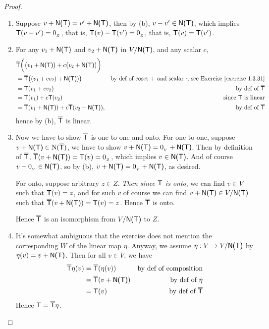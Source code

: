 \begin{proof} \ 

\begin{enumerate}
\item Suppose \(v + \textsf{N(T)} = v' + \textsf{N(T)}\), then by (b), \(v - v' \in \textsf{N(T)}\), which implies \(\textsf{T}(v - v') = 0_{_Z}\), that is, \(\textsf{T}(v) - \textsf{T}(v') = 0_{_Z}\), that is, \(\textsf{T}(v) = \textsf{T}(v')\).

\item For any \(v_1 + \textsf{N(T)}\) and \(v_2 + \textsf{N(T)}\) in \(V/\textsf{N(T)}\), and any scalar \(c\),
\begin{align*}
    & \overline{\T}\bigg( \big( v_1 + \NULLT \big) + c \big(v_2 + \NULLT \big)  \bigg) \\
    & = \overline{\T}\big( (v_1 + cv_2) + \NULLT) \big) & \text{by def of coset \(+\) and scalar \(\cdot\), see \EXEC{1.3.31}} \\
    & = \T(v_1 + cv_2) & \text{by def of \(\overline{\T}\)} \\
    & = \T(v_1) + c\T(v_2) & \text{since \(\T\) is linear} \\
    & = \overline{\T}(v_1 + \NULLT) + c\overline{\T}(v_2 + \NULLT), & \text{by def of \(\overline{\T}\)}
\end{align*}
hence by (b), \(\overline{\textsf{T}}\) is linear.

\item Now we have to show \(\overline{\textsf{T}}\) is one-to-one and onto.
For one-to-one, suppose \(v + \textsf{N(T)} \in \mathrm{N}(\overline{\textsf{T}})\), we have to show \(v + \textsf{N(T)} = 0_{_V} + \textsf{N(T)}\).
Then by definition of \(\overline{\textsf{T}}\), \(\overline{\textsf{T}}(v + \textsf{N(T)}) = \textsf{T}(v) = 0_{_Z}\), which implies \(v \in \textsf{N(T)}\).
And of course \(v - 0_{_V} \in \textsf{N(T)}\), so by (b), \(v + \textsf{N(T)} = 0_{_V} + \textsf{N(T)}\), as desired.

For onto, suppose arbitrary \(z \in Z\).
\emph{Then since \(\textsf{T}\) is onto}, we can find \(v \in V\) such that \(\textsf{T}(v) = z\), and for such \(v\) of course we can find \(v + \textsf{N(T)} \in V/\textsf{N(T)}\) such that \(\overline{\textsf{T}}(v + \textsf{N(T)}) = \textsf{T}(v) = z\).
Hence \(\overline{\textsf{T}}\) is onto.

Hence \(\overline{\textsf{T}}\) is an isomorphism from \(V/\textsf{N(T)}\) to \(Z\).

\item It's somewhat ambiguous that the exercise does not mention the corresponding \(W\) of the linear map \(\eta\).
Anyway, we assume \(\eta : V \to V/\textsf{N(T)}\) by \(\eta(v) = v + \textsf{N(T)}\).
Then for all \(v \in V\), we have
\begin{align*}
    \overline{\textsf{T}}\eta(v) & = \overline{\textsf{T}}(\eta(v)) & \text{by def of composition} \\
                         & = \overline{\textsf{T}}(v + \textsf{N(T)}) & \text{by def of \(\eta\)} \\
                         & = \textsf{T}(v) & \text{by def of \(\overline{\textsf{T}}\)}
\end{align*}
Hence \(\textsf{T} = \overline{\textsf{T}}\eta\).
\end{enumerate}
\end{proof}

